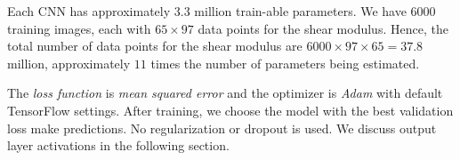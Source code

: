 \documentclass[12pt]{article}
\begin{document}
Each CNN has approximately $3.3$ million train-able parameters. We have $6000$ training images, each with $65\times97$ data points for the shear modulus. Hence, the total number of data points for the shear modulus are $6000\times97\times65=37.8$ million, approximately $11$ times the number of parameters being estimated.

The \textit{loss function} is \textit{mean squared error} and the optimizer is \textit{Adam} \cite{misc:kingma2017adam} with default TensorFlow settings. After training, we choose the model with the best validation loss make predictions. No regularization or dropout is used. We discuss output layer activations in the following section.
%
%
\end{document}
